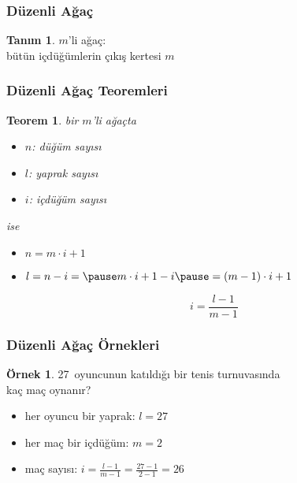 \documentclass[dvipsnames]{beamer}
\theoremstyle{definition}
\newtheorem{tanim}[theorem]{Tanım}
\theoremstyle{example}
\newtheorem{ornek}[theorem]{Örnek}
\theoremstyle{plain}
\newtheorem{teorem}[theorem]{Teorem}
\begin{document}
\begin{frame}
  \frametitle{Düzenli Ağaç}

  \begin{tanim}
    \alert{$m$'li ağaç}:\\
    bütün içdüğümlerin çıkış kertesi $m$
  \end{tanim}
\end{frame}

\begin{frame}
  \frametitle{Düzenli Ağaç Teoremleri}

  \begin{teorem}
    bir $m$'li ağaçta

    \begin{itemize}
      \item $n$: düğüm sayısı
      \item $l$: yaprak sayısı
      \item $i$: içdüğüm sayısı
    \end{itemize}

    ise

    \begin{itemize}
      \item $n = m \cdot i + 1$

      \pause
      \item  $l = n - i = \pause m \cdot i + 1 - i
        \pause = (m - 1) \cdot i + 1$

      \pause
      \[
        i = \frac{l - 1}{m - 1}
      \]
    \end{itemize}
  \end{teorem}
\end{frame}

\begin{frame}
  \frametitle{Düzenli Ağaç Örnekleri}

  \begin{ornek}
    27~oyuncunun katıldığı bir tenis turnuvasında\\
    kaç maç oynanır?

    \pause
    \bigskip
    \begin{itemize}
      \item her oyuncu bir yaprak: $l = 27$
      \item her maç bir içdüğüm: $m = 2$

      \pause
      \item maç sayısı: $i = \frac{l - 1}{m - 1} = \frac{27 - 1}{2 - 1} = 26$
    \end{itemize}
  \end{ornek}
\end{frame}
\end{document}
